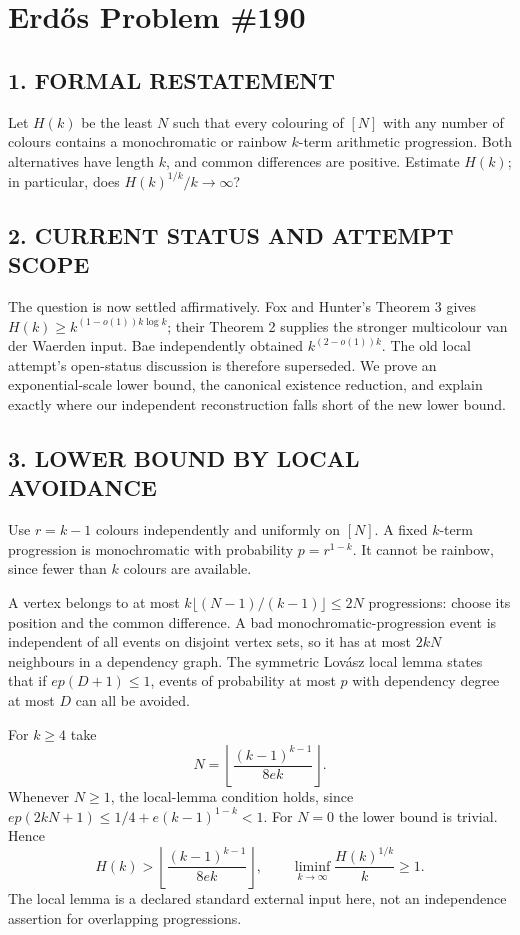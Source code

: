 \section{Erd\H{o}s Problem \#190}
\subsection*{1. FORMAL RESTATEMENT}
Let $H(k)$ be the least $N$ such that every colouring of $[N]$ with any number of colours contains a monochromatic or rainbow $k$-term arithmetic progression. Both alternatives have length $k$, and common differences are positive. Estimate $H(k)$; in particular, does $H(k)^{1/k}/k\to\infty$?
\subsection*{2. CURRENT STATUS AND ATTEMPT SCOPE}
The question is now settled affirmatively. Fox and Hunter's Theorem 3 gives $H(k)\ge k^{(1-o(1))k\log k}$; their Theorem 2 supplies the stronger multicolour van der Waerden input. Bae independently obtained $k^{(2-o(1))k}$. The old local attempt's open-status discussion is therefore superseded. We prove an exponential-scale lower bound, the canonical existence reduction, and explain exactly where our independent reconstruction falls short of the new lower bound.
\subsection*{3. LOWER BOUND BY LOCAL AVOIDANCE}
Use $r=k-1$ colours independently and uniformly on $[N]$. A fixed $k$-term progression is monochromatic with probability $p=r^{1-k}$. It cannot be rainbow, since fewer than $k$ colours are available.

A vertex belongs to at most $k\lfloor(N-1)/(k-1)\rfloor\le2N$ progressions: choose its position and the common difference. A bad monochromatic-progression event is independent of all events on disjoint vertex sets, so it has at most $2kN$ neighbours in a dependency graph. The symmetric Lov\'asz local lemma states that if $ep(D+1)\le1$, events of probability at most $p$ with dependency degree at most $D$ can all be avoided.

For $k\ge4$ take
\[
 N=\left\lfloor\frac{(k-1)^{k-1}}{8ek}\right\rfloor.
\]
Whenever $N\ge1$, the local-lemma condition holds, since
$ep(2kN+1)\le1/4+e(k-1)^{1-k}<1$.
For $N=0$ the lower bound is trivial. Hence
\[
 H(k)>\left\lfloor\frac{(k-1)^{k-1}}{8ek}\right\rfloor,
 \qquad \liminf_{k\to\infty}\frac{H(k)^{1/k}}k\ge1.       \tag{1}
\]
The local lemma is a declared standard external input here, not an independence assertion for overlapping progressions.
